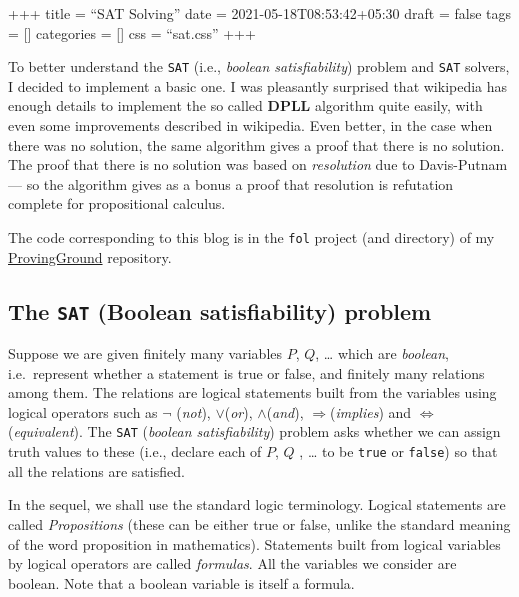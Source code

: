 +++ title = ``SAT Solving'' date = 2021-05-18T08:53:42+05:30 draft =
false tags = {[}{]} categories = {[}{]} css = ``sat.css'' +++

To better understand the \texttt{SAT} (i.e., \emph{boolean
satisfiability}) problem and \texttt{SAT} solvers, I decided to
implement a basic one. I was pleasantly surprised that wikipedia has
enough details to implement the so called \textbf{DPLL} algorithm quite
easily, with even some improvements described in wikipedia. Even better,
in the case when there was no solution, the same algorithm gives a proof
that there is no solution. The proof that there is no solution was based
on \emph{resolution} due to Davis-Putnam --- so the algorithm gives as a
bonus a proof that resolution is refutation complete for propositional
calculus.

The code corresponding to this blog is in the \texttt{fol} project (and
directory) of my
\href{https://github.com/siddhartha-gadgil/ProvingGround}{ProvingGround}
repository.

\hypertarget{the-sat-boolean-satisfiability-problem}{%
\subsection{\texorpdfstring{The \texttt{SAT} (Boolean satisfiability)
problem}{The SAT (Boolean satisfiability) problem}}\label{the-sat-boolean-satisfiability-problem}}

Suppose we are given finitely many variables \(P\), \(Q\), \ldots{}
which are \emph{boolean}, i.e.~represent whether a statement is true or
false, and finitely many relations among them. The relations are logical
statements built from the variables using logical operators such as
\(\neg\) (\emph{not}), \(\vee\)(\emph{or}), \(\wedge\)(\emph{and}),
\(\Rightarrow\)(\emph{implies}) and \(\Leftrightarrow\)
(\emph{equivalent}). The \texttt{SAT} (\emph{boolean satisfiability})
problem asks whether we can assign truth values to these (i.e., declare
each of \(P\), \(Q\) , \ldots{} to be \texttt{true} or \texttt{false})
so that all the relations are satisfied.

In the sequel, we shall use the standard logic terminology. Logical
statements are called \emph{Propositions} (these can be either true or
false, unlike the standard meaning of the word proposition in
mathematics). Statements built from logical variables by logical
operators are called \emph{formulas}. All the variables we consider are
boolean. Note that a boolean variable is itself a formula.

